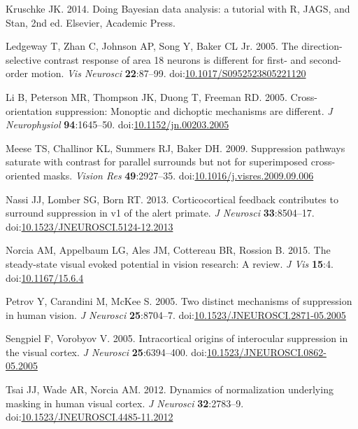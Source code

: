 \documentclass[]{article}
\begin{document}
\leavevmode\hypertarget{ref-Kruschke2014}{}%
Kruschke JK. 2014. Doing Bayesian data analysis: a tutorial with R, JAGS, and Stan, 2nd ed. Elsevier, Academic Press.

\leavevmode\hypertarget{ref-Ledgeway2005}{}%
Ledgeway T, Zhan C, Johnson AP, Song Y, Baker CL Jr. 2005. The direction-selective contrast response of area 18 neurons is different for first- and second-order motion. \emph{Vis Neurosci} \textbf{22}:87--99. doi:\href{https://doi.org/10.1017/S0952523805221120}{10.1017/S0952523805221120}

\leavevmode\hypertarget{ref-Li2005}{}%
Li B, Peterson MR, Thompson JK, Duong T, Freeman RD. 2005. Cross-orientation suppression: Monoptic and dichoptic mechanisms are different. \emph{J Neurophysiol} \textbf{94}:1645--50. doi:\href{https://doi.org/10.1152/jn.00203.2005}{10.1152/jn.00203.2005}

\leavevmode\hypertarget{ref-Meese2009}{}%
Meese TS, Challinor KL, Summers RJ, Baker DH. 2009. Suppression pathways saturate with contrast for parallel surrounds but not for superimposed cross-oriented masks. \emph{Vision Res} \textbf{49}:2927--35. doi:\href{https://doi.org/10.1016/j.visres.2009.09.006}{10.1016/j.visres.2009.09.006}

\leavevmode\hypertarget{ref-Nassi2013}{}%
Nassi JJ, Lomber SG, Born RT. 2013. Corticocortical feedback contributes to surround suppression in v1 of the alert primate. \emph{J Neurosci} \textbf{33}:8504--17. doi:\href{https://doi.org/10.1523/JNEUROSCI.5124-12.2013}{10.1523/JNEUROSCI.5124-12.2013}

\leavevmode\hypertarget{ref-Norcia2015}{}%
Norcia AM, Appelbaum LG, Ales JM, Cottereau BR, Rossion B. 2015. The steady-state visual evoked potential in vision research: A review. \emph{J Vis} \textbf{15}:4. doi:\href{https://doi.org/10.1167/15.6.4}{10.1167/15.6.4}

\leavevmode\hypertarget{ref-Petrov2005}{}%
Petrov Y, Carandini M, McKee S. 2005. Two distinct mechanisms of suppression in human vision. \emph{J Neurosci} \textbf{25}:8704--7. doi:\href{https://doi.org/10.1523/JNEUROSCI.2871-05.2005}{10.1523/JNEUROSCI.2871-05.2005}

\leavevmode\hypertarget{ref-Sengpiel2005}{}%
Sengpiel F, Vorobyov V. 2005. Intracortical origins of interocular suppression in the visual cortex. \emph{J Neurosci} \textbf{25}:6394--400. doi:\href{https://doi.org/10.1523/JNEUROSCI.0862-05.2005}{10.1523/JNEUROSCI.0862-05.2005}

\leavevmode\hypertarget{ref-Tsai2012}{}%
Tsai JJ, Wade AR, Norcia AM. 2012. Dynamics of normalization underlying masking in human visual cortex. \emph{J Neurosci} \textbf{32}:2783--9. doi:\href{https://doi.org/10.1523/JNEUROSCI.4485-11.2012}{10.1523/JNEUROSCI.4485-11.2012}
\end{document}

